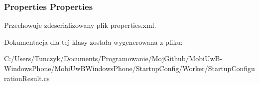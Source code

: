 \hypertarget{a00062_a9414f4a75f2d55ca70fa95608437c907}{}
\subsubsection[{Properties}]{\setlength{\rightskip}{0pt plus 5cm}Properties Properties}\label{a00062_a9414f4a75f2d55ca70fa95608437c907}


Przechowuje zdeserializowany plik properties.\+xml. 



Dokumentacja dla tej klasy została wygenerowana z pliku\+:\begin{DoxyCompactItemize}
\item 
C\+:/\+Users/\+Tunczyk/\+Documents/\+Programowanie/\+Moj\+Github/\+Mobi\+Uw\+B-\/\+Windows\+Phone/\+Mobi\+Uw\+B\+Windows\+Phone/\+Startup\+Config/\+Worker/Startup\+Configuration\+Result.\+cs\end{DoxyCompactItemize}
